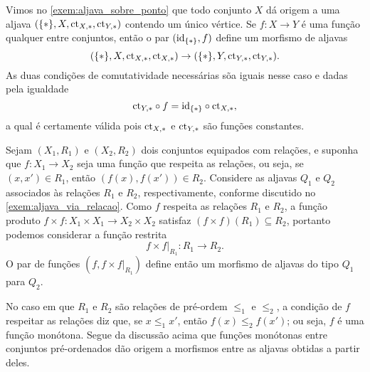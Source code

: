 \begin{exem}
    Vimos no \cref{exem:aljava_sobre_ponto} que todo conjunto $X$ dá origem a uma aljava $(\{*\},X,\mathrm{ct}_{X,*},\mathrm{ct}_{Y,*})$ contendo um único vértice.
    Se $f: X \to Y$ é uma função qualquer entre conjuntos, então o par $(\mathrm{id}_{\{*\}},f)$ define um morfismo de aljavas
    \begin{displaymath}
        (\{*\},X,\mathrm{ct}_{X,*},\mathrm{ct}_{X,*}) \to (\{*\},Y,\mathrm{ct}_{Y,*},\mathrm{ct}_{Y,*}).
    \end{displaymath}
    As duas condições de comutatividade necessárias sõa iguais nesse caso e dadas pela igualdade
    \begin{displaymath}
        \mathrm{ct}_{Y,*} \circ f = \mathrm{id}_{\{*\}} \circ \mathrm{ct}_{X,*},
    \end{displaymath}
    a qual é certamente válida pois $\mathrm{ct}_{X,*}$ e $\mathrm{ct}_{Y,*}$ são funções constantes.
\end{exem}

\begin{exem}
    Sejam $(X_1,R_1)$ e $(X_2,R_2)$ dois conjuntos equipados com relações, e suponha que $f: X_1 \to X_2$ seja uma função que respeita as relações, ou seja, se $(x,x') \in R_1$, então $(f(x),f(x')) \in R_2$.
    Considere as aljavas $Q_1$ e $Q_2$ associados às relações $R_1$ e $R_2$, respectivamente, conforme discutido no \cref{exem:aljava_via_relacao}.
    Como $f$ respeita as relações $R_1$ e $R_2$, a função produto $f \times f: X_1 \times X_1 \to X_2 \times X_2$ satisfaz $(f \times f)(R_1) \subseteq R_2$, portanto podemos considerar a função restrita
    \begin{displaymath}
        f \times f \rvert_{R_1}: R_1 \to R_2.
    \end{displaymath}
    O par de funções $(f,f \times f\rvert_{R_1})$ define então um morfismo de aljavas do tipo $Q_1$ para $Q_2$.
    
    No caso em que $R_1$ e $R_2$ são relações de pré-ordem $\leq_1$ e $\leq_2$, a condição de $f$ respeitar as relações diz que, se $x \leq_1 x'$, então $f(x) \leq_2 f(x')$; ou seja, $f$ é uma função monótona.
    Segue da discussão acima que funções monótonas entre conjuntos pré-ordenados dão origem a morfismos entre as aljavas obtidas a partir deles.
\end{exem}

